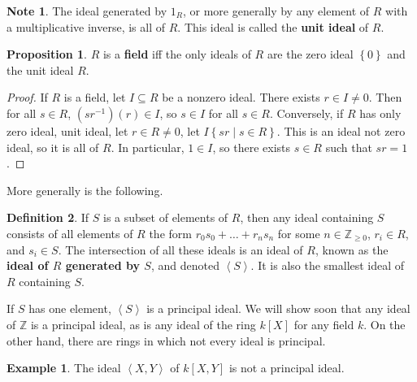 \documentclass{article}
\newcommand{\Z}{\mathbb{Z}}
\newcommand{\rb}[1]{\left( #1 \right)}
\renewcommand{\sb}[1]{\left[ #1 \right]}
\newcommand{\cb}[1]{\left\{ #1 \right\}}
\newcommand{\ab}[1]{\left\langle #1 \right\rangle}
\theoremstyle{definition}\newtheorem{definition}{Definition}[section]
\theoremstyle{definition}\newtheorem{remark}[definition]{Remark}
\theoremstyle{definition}\newtheorem*{example}{Example}
\theoremstyle{definition}\newtheorem*{note}{Note}
\newtheorem{proposition}[definition]{Proposition}
\begin{document}
\begin{note}
The ideal generated by $ 1_R $, or more generally by any element of $ R $ with a multiplicative inverse, is all of $ R $. This ideal is called the \textbf{unit ideal} of $ R $.
\end{note}

\begin{proposition}
$ R $ is a \textbf{field} iff the only ideals of $ R $ are the zero ideal $ \cb{0} $ and the unit ideal $ R $.
\end{proposition}

\begin{proof}
If $ R $ is a field, let $ I \subseteq R $ be a nonzero ideal. There exists $ r \in I \ne  0 $. Then for all $ s \in R $, $ \rb{sr^{-1}}\rb{r} \in I $, so $ s \in I $ for all $ s \in R $. Conversely, if $ R $ has only zero ideal, unit ideal, let $ r \in R \ne 0 $, let $ I \cb{sr \mid s \in R} $. This is an ideal not zero ideal, so it is all of $ R $. In particular, $ 1 \in I $, so there exists $ s \in R $ such that $ sr = 1 $.
\end{proof}

More generally is the following.

\begin{definition}
If $ S $ is a subset of elements of $ R $, then any ideal containing $ S $ consists of all elements of $ R $ the form $ r_0s_0 + \dots + r_ns_n $ for some $ n \in \Z_{\ge 0} $, $ r_i \in R $, and $ s_i \in S $. The intersection of all these ideals is an ideal of $ R $, known as the \textbf{ideal of $ R $ generated by $ S $}, and denoted $ \ab{S} $. It is also the smallest ideal of $ R $ containing $ S $.
\end{definition}

If $ S $ has one element, $ \ab{S} $ is a principal ideal. We will show soon that any ideal of $ \Z $ is a principal ideal, as is any ideal of the ring $ k\sb{X} $ for any field $ k $. On the other hand, there are rings in which not every ideal is principal.

\begin{example}
The ideal $ \ab{X, Y} $ of $ k\sb{X, Y} $ is not a principal ideal.
\end{example}
\end{document}
